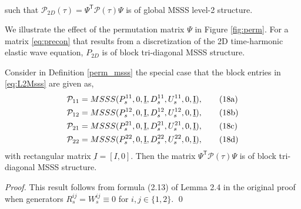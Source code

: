 {\begin{definition}
\begin{align*}
\end{align*}
such that $\mathcal{P}_{2D}(\tau) = \Psi^\mathsf{T} \mathcal{P}(\tau) \Psi$ is of global MSSS level-2 structure.
\end{definition}

We illustrate the effect of the permutation matrix $\Psi$ in Figure \ref{fig:perm}. For a matrix \eqref{eq:precon} that results from a discretization of the 2D time-harmonic elastic wave equation, $P_{2D}$ is of block tri-diagonal MSSS structure.

\begin{corollary}\label{tri_perm}
Consider in Definition \ref{perm_msss} the special case that the block entries in \eqref{eq:L2Msss} are given as,
\begin{align}
 \mathcal{P}_{11} &= MSSS(P_s^{11}, 0, \underbar{I}, D_s^{11}, U_s^{11}, 0, \underbar{I}), \tag{18a} \label{P11}\\
 \mathcal{P}_{12} &= MSSS(P_s^{12}, 0, \underbar{I}, D_s^{12}, U_s^{12}, 0, \underbar{I}), \tag{18b} \label{P12}\\
 \mathcal{P}_{21} &= MSSS(P_s^{21}, 0, \underbar{I}, D_s^{21}, U_s^{21}, 0, \underbar{I}), \tag{18c} \label{P21}\\
 \mathcal{P}_{22} &= MSSS(P_s^{22}, 0, \underbar{I}, D_s^{22}, U_s^{22}, 0, \underbar{I}), \tag{18d} \label{P22} \setcounter{equation}{18}
\end{align}
with rectangular matrix $\underbar{I} = [I,0]$. Then the matrix $\Psi^\mathsf{T} \mathcal{P}(\tau) \Psi$ is of block tri-diagonal MSSS structure.
\end{corollary}
\begin{proof}
 This result follows from formula (2.13) of Lemma 2.4 in the original proof \cite{QG15} when generators $R^{ij}_s=W^{ij}_s\equiv0$ for $ i,j \in \{1,2\}$. \qed
\end{proof}

}
